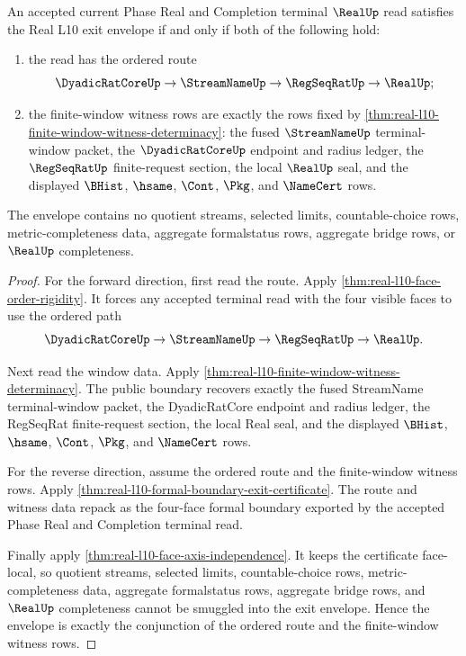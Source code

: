 \begin{theorem}
\label{thm:real-l10-terminal-order-window-witness-envelope}
An accepted current Phase Real and Completion terminal $\RealUp$ read satisfies
the Real L10 exit envelope if and only if both of the following hold:
\begin{enumerate}
\item the read has the ordered route
$$
\DyadicRatCoreUp \to \StreamNameUp \to \RegSeqRatUp \to \RealUp;
$$
\item the finite-window witness rows are exactly the rows fixed by
\autoref{thm:real-l10-finite-window-witness-determinacy}: the fused
$\StreamNameUp$ terminal-window packet, the $\DyadicRatCoreUp$ endpoint and
radius ledger, the $\RegSeqRatUp$ finite-request section, the local $\RealUp$
seal, and the displayed $\BHist$, $\hsame$, $\Cont$, $\Pkg$, and $\NameCert$
rows.
\end{enumerate}
The envelope contains no quotient streams, selected limits,
countable-choice rows, metric-completeness data, aggregate formalstatus rows,
aggregate bridge rows, or $\RealUp$ completeness.
\end{theorem}
\begin{proof}
For the forward direction, first read the route. Apply
\autoref{thm:real-l10-face-order-rigidity}. It forces any accepted terminal read
with the four visible faces to use the ordered path
$$
\DyadicRatCoreUp \to \StreamNameUp \to \RegSeqRatUp \to \RealUp.
$$

Next read the window data. Apply
\autoref{thm:real-l10-finite-window-witness-determinacy}. The public boundary
recovers exactly the fused StreamName terminal-window packet, the DyadicRatCore
endpoint and radius ledger, the RegSeqRat finite-request section, the local Real
seal, and the displayed $\BHist$, $\hsame$, $\Cont$, $\Pkg$, and $\NameCert$
rows.

For the reverse direction, assume the ordered route and the finite-window
witness rows. Apply
\autoref{thm:real-l10-formal-boundary-exit-certificate}. The route and witness
data repack as the four-face formal boundary exported by the accepted Phase Real
and Completion terminal read.

Finally apply \autoref{thm:real-l10-face-axis-independence}. It keeps the
certificate face-local, so quotient streams, selected limits,
countable-choice rows, metric-completeness data, aggregate formalstatus rows,
aggregate bridge rows, and $\RealUp$ completeness cannot be smuggled into the
exit envelope. Hence the envelope is exactly the conjunction of the ordered
route and the finite-window witness rows.
\end{proof}

